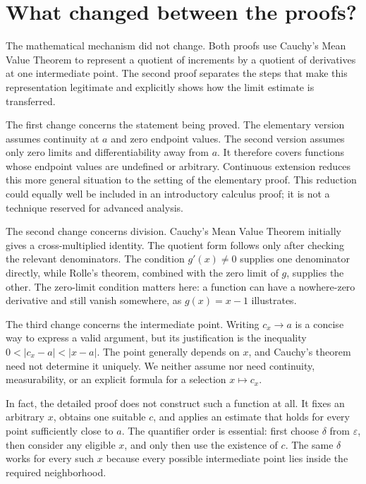 \documentclass{essay}
\begin{document}
\section{What changed between the proofs?}

The mathematical mechanism did not change. Both proofs use Cauchy's Mean
Value Theorem to represent a quotient of increments by a quotient of
derivatives at one intermediate point. The second proof separates the
steps that make this representation legitimate and explicitly shows how
the limit estimate is transferred.

The first change concerns the statement being proved. The elementary
version assumes continuity at \(a\) and zero endpoint values. The second
version assumes only zero limits and differentiability away from \(a\).
It therefore covers functions whose endpoint values are undefined or
arbitrary. Continuous extension reduces this more general situation to
the setting of the elementary proof. This reduction could equally well
be included in an introductory calculus proof; it is not a technique
reserved for advanced analysis.

The second change concerns division. Cauchy's Mean Value Theorem initially
gives a cross-multiplied identity. The quotient form follows only after
checking the relevant denominators. The condition \(g'(x)\ne0\) supplies one
denominator directly, while Rolle's theorem, combined with the zero
limit of \(g\), supplies the other. The zero-limit condition matters here:
a function can have a nowhere-zero derivative and still vanish somewhere,
as \(g(x)=x-1\) illustrates.

The third change concerns the intermediate point. Writing \(c_{x}\to a\) is
a concise way to express a valid argument, but its justification is the
inequality \(0<|c_{x}-a|<|x-a|\). The point generally depends on \(x\), and
Cauchy's theorem need not determine it uniquely. We neither assume nor
need continuity, measurability, or an explicit formula for a selection
\(x\mapsto c_{x}\).

In fact, the detailed proof does not construct such a function at all.
It fixes an arbitrary \(x\), obtains one suitable \(c\), and applies an
estimate that holds for every point sufficiently close to \(a\). The
quantifier order is essential: first choose \(\delta\) from
\(\varepsilon\), then consider any eligible \(x\), and only then use the
existence of \(c\). The same \(\delta\) works for every such \(x\) because
every possible intermediate point lies inside the required neighborhood.
\end{document}
